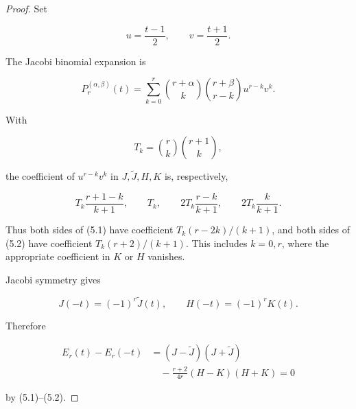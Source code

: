 \documentclass[11pt]{article}
\numberwithin{equation}{section}
\begin{document}
\begin{proof}

Set

\nopagebreak[4]
\[
u=\frac{t-1}{2},\qquad v=\frac{t+1}{2}.
\]

The Jacobi binomial expansion is

\nopagebreak[4]
\[
P_r^{(\alpha,\beta)}(t)
=\sum_{k=0}^r
\binom{r+\alpha}{k}
\binom{r+\beta}{r-k}u^{r-k}v^k.
\tag{5.4}
\]

With

\nopagebreak[4]
\[
T_k=\binom rk\binom{r+1}k,
\]

the coefficient of $u^{r-k}v^k$ in $J,\widetilde J,H,K$ is, respectively,

\nopagebreak[4]
\[
T_k\frac{r+1-k}{k+1},\qquad
T_k,\qquad
2T_k\frac{r-k}{k+1},\qquad
2T_k\frac{k}{k+1}.
\tag{5.5}
\]

Thus both sides of (5.1) have coefficient
$T_k(r-2k)/(k+1)$, and both sides of (5.2) have coefficient
$T_k(r+2)/(k+1)$. This includes $k=0,r$, where the appropriate coefficient
in $K$ or $H$ vanishes.

Jacobi symmetry gives

\nopagebreak[4]
\[
J(-t)=(-1)^r\widetilde J(t),\qquad
H(-t)=(-1)^rK(t).
\]

Therefore

\nopagebreak[4]
\[
\begin{aligned}
E_r(t)-E_r(-t)
&=(J-\widetilde J)(J+\widetilde J)\\
&\quad-\frac{r+2}{4r}(H-K)(H+K)=0
\end{aligned}
\]

by (5.1)--(5.2).
\end{proof}
\end{document}
